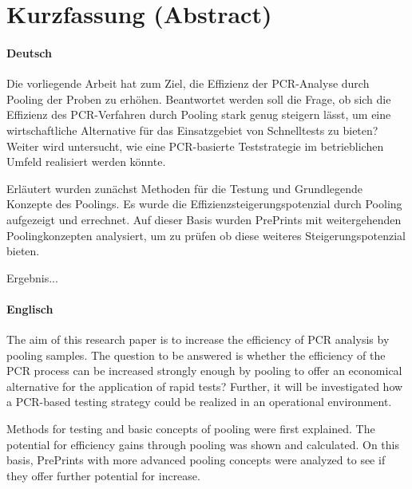 \chapter*{Kurzfassung (Abstract)}

\subsubsection{Deutsch}
Die vorliegende Arbeit hat zum Ziel, die Effizienz der PCR-Analyse durch Pooling der Proben zu erhöhen.
Beantwortet werden soll die Frage, ob sich die Effizienz des PCR-Verfahren durch Pooling stark genug steigern lässt, um eine wirtschaftliche Alternative für das Einsatzgebiet von Schnelltests zu bieten?
Weiter wird untersucht, wie eine PCR-basierte Teststrategie im betrieblichen Umfeld realisiert werden könnte.

Erläutert wurden zunächst Methoden für die Testung und Grundlegende Konzepte des Poolings.
Es wurde die Effizienzsteigerungspotenzial durch Pooling aufgezeigt und errechnet.
Auf dieser Basis wurden PrePrints mit weitergehenden Poolingkonzepten analysiert, um zu prüfen ob diese weiteres Steigerungspotenzial bieten.

Ergebnis...

\subsubsection{Englisch} %
The aim of this research paper is to increase the efficiency of PCR analysis by pooling samples.
The question to be answered is whether the efficiency of the PCR process can be increased strongly enough by pooling to offer an economical alternative for the application of rapid tests?
Further, it will be investigated how a PCR-based testing strategy could be realized in an operational environment.

Methods for testing and basic concepts of pooling were first explained.
The potential for efficiency gains through pooling was shown and calculated.
On this basis, PrePrints with more advanced pooling concepts were analyzed to see if they offer further potential for increase.